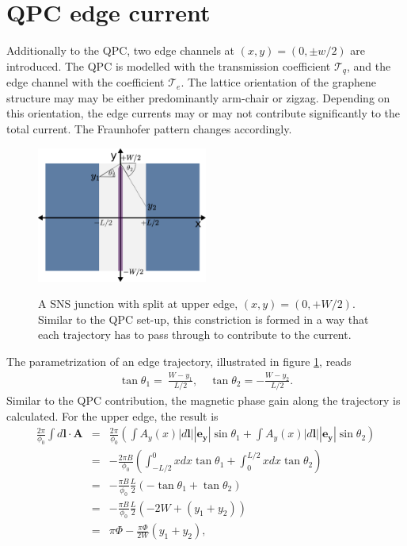\section{QPC edge current}
Additionally to the QPC, two edge channels at $(x, y) = (0, \pm w/2)$ are introduced. The QPC is modelled with the transmission coefficient $\mathcal{T}_q$, and the edge channel with the coefficient $\mathcal{T}_e$. The lattice orientation of the graphene structure may may be either predominantly arm-chair or zigzag. Depending on this orientation, the edge currents may or may not contribute significantly  to the total current. The Fraunhofer pattern changes accordingly.
\begin{figure}
\centering
\includegraphics[width=0.5\textwidth]{figure/analyticalmodel/qpc_edges_angles}\label{fig:qpc-edge-parametrization}
\caption{A SNS junction with split at upper edge, $(x, y) = (0, + W/2)$. Similar to the QPC set-up, this constriction is formed in a way that each trajectory has to pass through to contribute to the current.}
\end{figure}
The parametrization of an edge trajectory, illustrated in figure \ref{fig:qpc-edge-parametrization}, reads
\begin{eqnarray}
\tan \theta_1 = ~\frac{ W - y_1}{L/2}, \quad \tan \theta_2 = -\frac{W - y_2}{L/2} \label{eq:angles-edge}.
\end{eqnarray}
Similar to the QPC contribution, the magnetic phase gain along the trajectory is calculated. For the upper edge, the result is
\begin{eqnarray}
\frac{2 \pi}{\phi_0} \int d \mathbf{l} \cdot \mathbf{A} &=& \frac{2 \pi}{\phi_0} \left( \int A_y(x) |d\mathbf{l}| |\mathbf{e_y}| \sin \theta_1 + \int A_y(x) |d\mathbf{l}| |\mathbf{e_y}| \sin \theta_2  \right)\\
&=&  - \frac{2 \pi B}{\phi_0} \left( \int_{-L/2}^{0} x dx \tan \theta_1 + \int_{0}^{L/2} x dx \tan \theta_2 \right) \\
&=&  - \frac{\pi B}{\phi_0} \frac{L}{2} \left( - \tan \theta_1 + \tan \theta_2 \right) \\
&=& - \frac{\pi B}{\phi_0} \frac{L}{2} \left( -2W + (y_1 + y_2) \right)\\
&=& \pi \Phi -\frac{\pi \Phi }{2 W} (y_1 + y_2),
\end{eqnarray}
